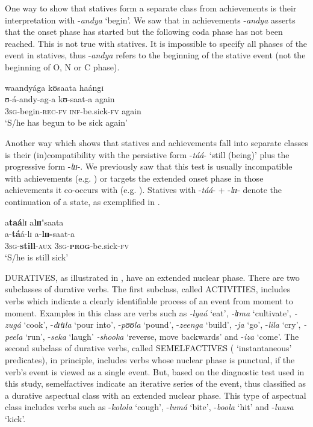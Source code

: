 \documentclass[output=paper]{langscibook}
\begin{document}
One way to show that statives form a separate class from achievements is their interpretation with -\textit{andya} ‘begin’. We saw that in achievements -\textit{andya} asserts that the onset phase has started but the following coda phase has not been reached. This is not true with statives. It is impossible to specify all phases of the event in statives, thus -\textit{andya} refers to the beginning of the stative event (not the beginning of O, N or C phase).

\ea \label{ex:kanijo:12}
\glll waandyága      kʊsaata          haángɪ \\
ʊ-á-andy-ag-a kʊ-saat-a again\\
3\textsc{sg}-begin-\textsc{rec}-\textsc{fv} \textsc{inf}-be.sick-\textsc{fv} again\\ 
\glt ‘S/he has begun to be sick again’\\
\z

Another way which shows that statives and achievements fall into separate classes is their (in)compatibility with the persistive form -\textit{táá}- ‘still (being)’ plus the progressive form -\textit{lɪɪ}-. We previously saw that this test is usually incompatible with achievements (e.g. ) or targets the extended onset phase in those achievements it co-occurs with (e.g. ). Statives with -\textit{táá}- + -\textit{lɪɪ}- denote the continuation of a state, as exemplified in . 

\ea \label{ex:kanijo:13}
\glll a\textbf{taá}lɪ      a\textbf{l}\textbf{ɪɪ}\textbf{\'{}}saata\\
a-\textbf{tá}á-lɪ             a-\textbf{lɪɪ}\textbf{-}saat-a\\
3\textsc{sg}-\textbf{still}-\textsc{aux} 3\textsc{sg}-\textbf{\textsc{prog}}-be.sick-\textsc{fv}\\
\glt ‘S/he is still sick’
\z

DURATIVES, as illustrated in , have an extended nuclear phase. There are two subclasses of durative verbs. The first subclass, called ACTIVITIES, includes verbs which indicate a clearly identifiable process of an event from moment to moment. Examples in this class are verbs such as \textit{-lyaá} ‘eat’, \textit{-lɪ}\textit{ma} ‘cultivate’, \textit{-zugá} ‘cook’, -\textit{dɪ}\textit{tɪ}\textit{la} ‘pour into’, -\textit{pʊʊ}\textit{la} ‘pound’, -\textit{zeenga} ‘build’, \textit{-ja} ‘go’, -\textit{lila} ‘cry’, \textit{-peela} ‘run’, -\textit{seka} ‘laugh’ \textit{-shooka} ‘reverse, move backwards’ and -\textit{iza} ‘come’. The second subclass of durative verbs, called SEMELFACTIVES ( ‘instantaneous’ predicates), in principle, includes verbs whose nuclear phase is punctual, if the verb’s event is viewed as a single event. But, based on the diagnostic test used in this study, semelfactives indicate an iterative series of the event, thus classified as a durative aspectual class with an extended nuclear phase. This type of aspectual class includes verbs such as -\textit{kolola} ‘cough’, -\textit{lumá} ‘bite’, -\textit{boola} ‘hit’ and -\textit{luusa} ‘kick’. 
\end{document}
